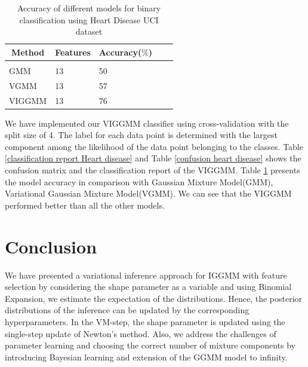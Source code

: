 \documentclass[letterpaper]{article}
\begin{document}
        \begin{table}[h]
            \caption{Accuracy of different models for binary classification using Heart Disease UCI dataset}
            \label{binary classification heart Disease}
            \begin{center}
            \begin{tabular}{lllll}
            \multicolumn{1}{c}{\bf Method}  &\multicolumn{1}{c}{\bf Features} &\multicolumn{1}{c}{\bf Accuracy($\%$)}   \\
            \hline \\
            GMM         &13 &50 \\
            VGMM             &13  &57\\
            VIGGMM             &13  &76\\
            \end{tabular}
            \end{center}
            \end{table}
We have implemented our VIGGMM classifier using cross-validation with the split size of 4. 
The label for each data point is determined with the largest component among the likelihood of the data point belonging to the classes.
Table \ref{classification report  Heart disease}  and Table \ref{confusion heart disease} shows the confusion matrix and the classification report of the VIGGMM. 
Table \ref{binary classification heart Disease} presents the model accuracy in comparison with Gaussian Mixture Model(GMM), Variational Gaussian Mixture Model(VGMM). We can see that the VIGGMM performed better than all the other models.
            
\section{Conclusion}
We have presented a variational inference approach for IGGMM with feature selection by 
considering the shape parameter as a variable and using Binomial Expansion, 
we estimate the expectation of the distributions. Hence, the posterior distributions 
of the inference can be updated by the corresponding hyperparameters.
In the VM-step, the shape parameter is updated using the single-step update of Newton’s method. 
Also, we address the challenges of parameter learning and choosing the correct number of 
mixture components by introducing Bayesian learning and extension of the 
GGMM model to infinity.
\end{document}
